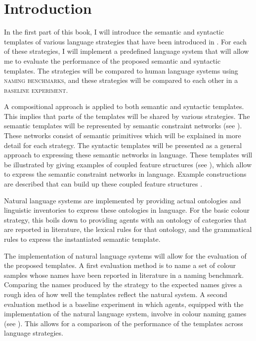 \section*{Introduction}

In the first part of this book, I will introduce the semantic and
syntactic templates of various language strategies that have been
introduced in . For each of these
strategies, I will implement a predefined language system that will
allow me to evaluate the performance of the proposed semantic and
syntactic templates. The strategies will be compared to human language
systems using \textsc{naming benchmarks}, and these strategies will be
compared to each other in a \textsc{baseline experiment}.

A compositional approach is applied to both
semantic and syntactic
  templates. This implies that parts of the
templates will be shared by various strategies. The semantic templates
will be represented by semantic constraint networks (see ). These networks consist of
semantic primitives which will be explained in more detail for each
strategy. The syntactic templates will be presented as a general
approach to expressing these semantic networks in language. These
templates will be illustrated by giving examples of coupled feature
structures (see ), which
allow to express the semantic constraint networks in language. Example
constructions are described that can build up these coupled feature
structures \citep{bleys06next, steels07emergence, bleys08expressing}.

Natural language systems are implemented by providing actual
ontologies and linguistic inventories to express these ontologies in
language. For the basic colour strategy, this boils down to providing
agents with an ontology of categories that are reported in literature,
the lexical rules for that ontology, and the grammatical rules to
express the instantiated semantic template.

The implementation of natural language systems will allow for the
evaluation of the proposed templates. A first evaluation method is to
name a set of colour samples whose names have been reported in
literature in a naming benchmark. 
Comparing the names produced by the strategy to the
expected names gives a rough idea of how well the templates reflect
the natural system. A second evaluation method is a baseline
  experiment in which agents, equipped
with the implementation of the natural language system, involve in
colour naming games (see ). This allows for a comparison of
the performance of the templates across language strategies.

\newpage
\thispagestyle{empty}
